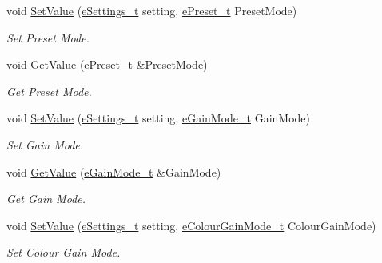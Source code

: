 \begin{DoxyCompactItemize}
void \mbox{\hyperlink{struct_quantum_lib_1_1_setting_data__t_ab29818ab5e44fe740beb1745c6049720}{Set\+Value}} (\mbox{\hyperlink{namespace_quantum_lib_acc8124e3e65bca4aa798d03a55e3d54c}{e\+Settings\+\_\+t}} setting, \mbox{\hyperlink{namespace_quantum_lib_a74d29df2264e3cb8e03e70007c7152f8}{e\+Preset\+\_\+t}} Preset\+Mode)
\begin{DoxyCompactList}\small\item\em Set Preset Mode. \end{DoxyCompactList}\item 
void \mbox{\hyperlink{struct_quantum_lib_1_1_setting_data__t_a056d861919bf7bcea36ded28e7940345}{Get\+Value}} (\mbox{\hyperlink{namespace_quantum_lib_a74d29df2264e3cb8e03e70007c7152f8}{e\+Preset\+\_\+t}} \&Preset\+Mode)
\begin{DoxyCompactList}\small\item\em Get Preset Mode. \end{DoxyCompactList}\item 
void \mbox{\hyperlink{struct_quantum_lib_1_1_setting_data__t_a2092a8fe47c6909fd43ec6a900d75ca8}{Set\+Value}} (\mbox{\hyperlink{namespace_quantum_lib_acc8124e3e65bca4aa798d03a55e3d54c}{e\+Settings\+\_\+t}} setting, \mbox{\hyperlink{namespace_quantum_lib_a20b6e658baa33fde788739a47dab2e13}{e\+Gain\+Mode\+\_\+t}} Gain\+Mode)
\begin{DoxyCompactList}\small\item\em Set Gain Mode. \end{DoxyCompactList}\item 
void \mbox{\hyperlink{struct_quantum_lib_1_1_setting_data__t_ae8252ac69dc0d46a5ceb6af6df555ef0}{Get\+Value}} (\mbox{\hyperlink{namespace_quantum_lib_a20b6e658baa33fde788739a47dab2e13}{e\+Gain\+Mode\+\_\+t}} \&Gain\+Mode)
\begin{DoxyCompactList}\small\item\em Get Gain Mode. \end{DoxyCompactList}\item 
void \mbox{\hyperlink{struct_quantum_lib_1_1_setting_data__t_a2e8563582f8c8e615aa52714459eca5c}{Set\+Value}} (\mbox{\hyperlink{namespace_quantum_lib_acc8124e3e65bca4aa798d03a55e3d54c}{e\+Settings\+\_\+t}} setting, \mbox{\hyperlink{namespace_quantum_lib_a4e404872667f9386ba59973f4b29fe65}{e\+Colour\+Gain\+Mode\+\_\+t}} Colour\+Gain\+Mode)
\begin{DoxyCompactList}\small\item\em Set Colour Gain Mode. \end{DoxyCompactList}\item 

\end{DoxyCompactItemize}
